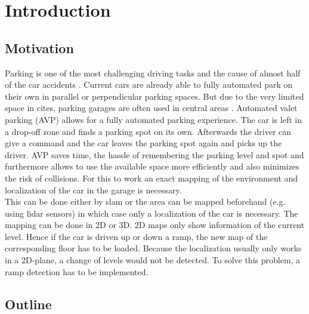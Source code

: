 \chapter{Introduction}
\label{ch:Introduction}

\section{Motivation}
Parking is one of the most challenging driving tasks and the cause of almost half of the car accidents \cite{accident}.
Current cars are already able to fully automated park on their own in parallel or perpendicular parking spaces.
But due to the very limited space in cites, parking garages are often used in central areas \cite{7995971}.
Automated valet parking (AVP) allows for a fully automated parking experience.
The car is left in a drop-off zone and finds a parking spot on its own.
 Afterwards the driver can give a command and the car leaves the parking spot again and picks up the driver.
 AVP saves time, the hassle of remembering the parking level and spot and furthermore allows to use the available space more efficiently and also minimizes the risk of collisions.
 For this to work an exact mapping of the environment and localization of the car in the garage is necessary.\\
This can be done either by \acrfull{slam} or the area can be mapped beforehand (e.g. using \acrshort{lidar} sensors) in which case only a localization of the car is necessary.
The mapping can be done in 2D or 3D. 2D maps only show information of the current level. Hence if the car is driven up or down a ramp, the new map of the corresponding floor has to be loaded.
Because the localization usually only works in a 2D-plane, a change of levels would not be detected.
To solve this problem, a ramp detection has to be implemented.



\section{Outline}
